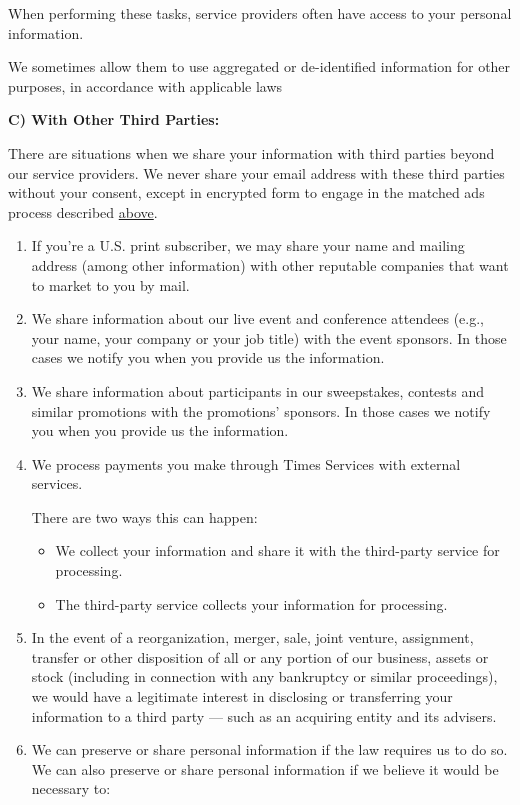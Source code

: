 When performing these tasks, service providers often have access to your
personal information.

We sometimes allow them to use aggregated or de-identified information
for other purposes, in accordance with applicable laws

\textbf{C) With Other Third Parties:}

There are situations when we share your information with third parties
beyond our service providers. We never share your email address with
these third parties without your consent, except in encrypted form to
engage in the matched ads process described
\protect\hyperlink{anchor-question2-sectionH}{above}.

\begin{enumerate}
\def\labelenumi{\arabic{enumi}.}
\item
  If you're a U.S. print subscriber, we may share your name and mailing
  address (among other information) with other reputable companies that
  want to market to you by mail.
\item
  We share information about our live event and conference attendees
  (e.g., your name, your company or your job title) with the event
  sponsors. In those cases we notify you when you provide us the
  information.
\item
  We share information about participants in our sweepstakes, contests
  and similar promotions with the promotions' sponsors. In those cases
  we notify you when you provide us the information.
\item
  We process payments you make through Times Services with external
  services.

  There are two ways this can happen:

  \begin{itemize}
  \tightlist
  \item
    We collect your information and share it with the third-party
    service for processing.
  \item
    The third-party service collects your information for processing.
  \end{itemize}
\item
  In the event of a reorganization, merger, sale, joint venture,
  assignment, transfer or other disposition of all or any portion of our
  business, assets or stock (including in connection with any bankruptcy
  or similar proceedings), we would have a legitimate interest in
  disclosing or transferring your information to a third party --- such
  as an acquiring entity and its advisers.
\item
  We can preserve or share personal information if the law requires us
  to do so. We can also preserve or share personal information if we
  believe it would be necessary to:


\end{enumerate}
